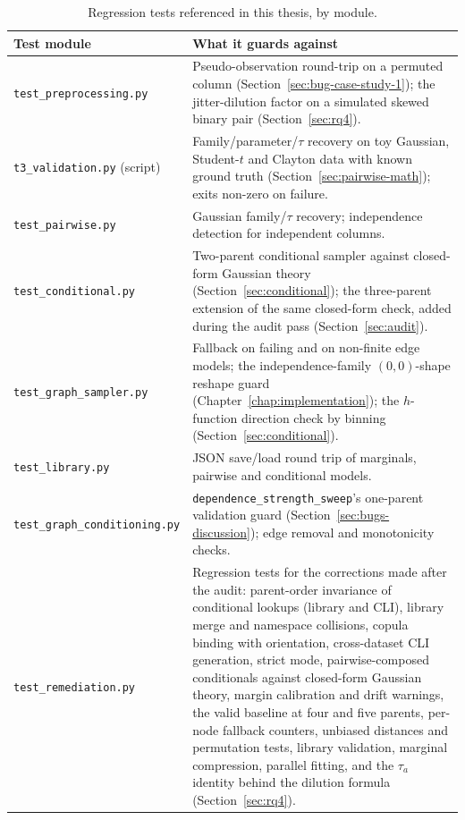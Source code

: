 \documentclass[
  english,
  class=report,
  accentcolor=2c,
  marginpar=false,
  parskip=half-,
  fontsize=11pt,
  ruledheaders=false,
  pdfa=false,
  IMRAD=false,
  thesis={type=master}
]{tudapub}
\begin{document}
\begin{table}[ht]
\caption{Regression tests referenced in this thesis, by module.}
\label{tab:test-suite}
\centering
\begin{tabular}{lp{8.7cm}}
\toprule
\textbf{Test module} & \textbf{What it guards against} \\
\midrule
\texttt{test\_preprocessing.py} & Pseudo-observation round-trip on a permuted column (Section~\ref{sec:bug-case-study-1}); the jitter-dilution factor on a simulated skewed binary pair (Section~\ref{sec:rq4}). \\
\texttt{t3\_validation.py} (script) & Family/parameter/$\tau$ recovery on toy Gaussian, Student-$t$ and Clayton data with known ground truth (Section~\ref{sec:pairwise-math}); exits non-zero on failure. \\
\texttt{test\_pairwise.py} & Gaussian family/$\tau$ recovery; independence detection for independent columns. \\
\texttt{test\_conditional.py} & Two-parent conditional sampler against closed-form Gaussian theory (Section~\ref{sec:conditional}); the three-parent extension of the same closed-form check, added during the audit pass (Section~\ref{sec:audit}). \\
\texttt{test\_graph\_sampler.py} & Fallback on failing and on non-finite edge models; the independence-family $(0,0)$-shape reshape guard (Chapter~\ref{chap:implementation}); the $h$-function direction check by binning (Section~\ref{sec:conditional}). \\
\texttt{test\_library.py} & JSON save/load round trip of marginals, pairwise and conditional models. \\
\texttt{test\_graph\_conditioning.py} & \texttt{dependence\_strength\_sweep}'s one-parent validation guard (Section~\ref{sec:bugs-discussion}); edge removal and monotonicity checks. \\
\texttt{test\_remediation.py} & Regression tests for the corrections made after the audit: parent-order invariance of conditional lookups (library and CLI), library merge and namespace collisions, copula binding with orientation, cross-dataset CLI generation, strict mode, pairwise-composed conditionals against closed-form Gaussian theory, margin calibration and drift warnings, the valid baseline at four and five parents, per-node fallback counters, unbiased distances and permutation tests, library validation, marginal compression, parallel fitting, and the $\tau_a$ identity behind the dilution formula (Section~\ref{sec:rq4}). \\

\end{tabular}
\end{table}
\end{document}
